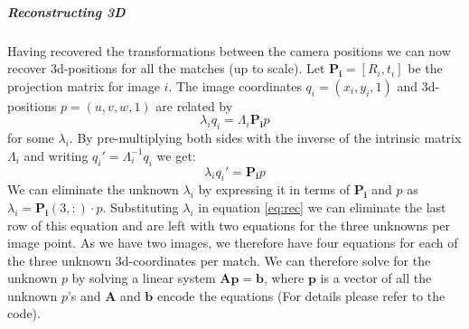 \documentclass{paper}
\begin{document}
\subparagraph{Reconstructing 3D}
Having recovered the transformations between the camera positions we can now recover 3d-positions for all the matches (up to scale).
Let $\mathbf{P_i}=\left[ R_i, t_i \right] $ be the projection matrix for image $i$. The image coordinates $q_i=(x_i,y_i,1)$  and 3d-positions $p=(u,v,w,1)$ are related by
\begin{equation}
\lambda_i q_i = \Lambda_i \mathbf{P_i} p
\end{equation}
for some $\lambda_i$. By pre-multiplying both sides with the inverse of the intrinsic matrix $\Lambda_i$ and writing $q_i'=\Lambda_i^{-1} q_i$ we get:
\begin{equation}
\lambda_i q_i' =  \mathbf{P_i} p
\label{eq:rec}
\end{equation}
We can eliminate the unknown $\lambda_i$ by expressing it in terms of $\mathbf{P_i}$ and $p$ as $\lambda_i=\mathbf{P_i}(3,:)\cdot p$. 
Substituting $\lambda_i$ in equation \ref{eq:rec} we can eliminate the last row of this equation and are left with two equations for the three unknowns per image point. As we have two images, we therefore have four equations for each of the three unknown 3d-coordinates per match. We can therefore solve for the unknown $p$ by solving a linear system $\mathbf{A}\mathbf{p}=\mathbf{b}$, where $\mathbf{p}$ is a vector of all the unknown $p$'s and  $\mathbf{A}$ and $\mathbf{b}$ encode the equations (For details please refer to the code).
\end{document}
